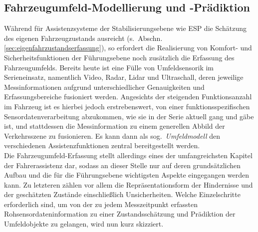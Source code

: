\subsection{Fahrzeugumfeld-Modellierung und -Prädiktion}
Während für Assistenzsysteme der Stabilisierungsebene wie ESP die Schätzung des eigenen Fahrzeugzustands ausreicht (s.\ Abschn.\,\ref{sec:eigenfahrzustandserfassung}), so erfordert die Realisierung von Komfort- und Sicherheitsfunktionen der Führungsebene noch zusätzlich die Erfassung des Fahrzeugumfelds. Bereits heute ist eine Fülle von Umfeldsensorik im Serieneinsatz, namentlich Video, Radar, Lidar und Ultraschall, deren jeweilige Messinformationen aufgrund unterschiedlicher Genauigkeiten und Erfassungsbereiche fusioniert werden. Angesichts der steigenden Funktionsanzahl im Fahrzeug ist es hierbei jedoch erstrebenswert, von einer funktionsspezifischen Sensordatenverarbeitung abzukommen, wie sie in der Serie aktuell gang und gäbe ist, und stattdessen die Messinformation zu einem generellen Abbild der Verkehrsszene zu fusionieren. Es kann dann als sog.\ \emph{Umfeldmodell} \cite{mahlisch2009filtersynthese} den verschiedenen Assistenzfunktionen zentral bereitgestellt werden. \\
Die Fahrzeugumfeld-Erfassung stellt allerdings eines der umfangreichsten Kapitel der Fahrerassistenz dar, sodass an dieser Stelle nur auf deren grundsätzlichen Aufbau und die für die Führungsebene wichtigsten Aspekte eingegangen werden kann. Zu letzteren zählen vor allem die Repräsentationsform der Hindernisse und der geschätzten Zustände einschließlich Unsicherheiten. %
Welche Einzelschritte erforderlich sind, um von der zu jedem Messzeitpunkt erfassten Rohsensordateninformation zu einer Zustandsschätzung und Prädiktion der Umfeldobjekte zu gelangen, wird nun kurz skizziert. \\


